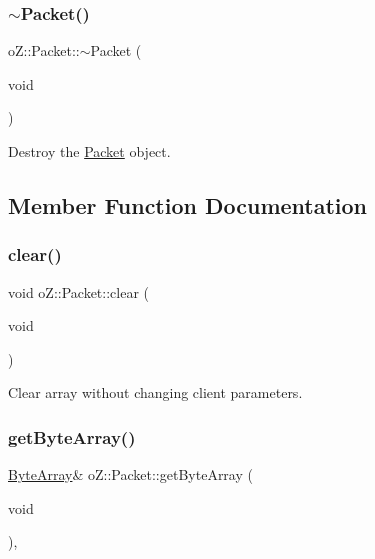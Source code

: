 \mbox{\label{classo_z_1_1_packet_a01d80a0c452b1e07dfd160f494be2af5}} 
\subsubsection{\texorpdfstring{$\sim$Packet()}{~Packet()}}
{\footnotesize\ttfamily o\+Z\+::\+Packet\+::$\sim$\+Packet (\begin{DoxyParamCaption}\item[{void}]{ }\end{DoxyParamCaption})\hspace{0.3cm}{\ttfamily [default]}}



Destroy the \mbox{\hyperlink{classo_z_1_1_packet}{Packet}} object. 



\subsection{Member Function Documentation}
\mbox{\label{classo_z_1_1_packet_aa7eafcf9801973978216f2de4c09867d}} 
\subsubsection{\texorpdfstring{clear()}{clear()}}
{\footnotesize\ttfamily void o\+Z\+::\+Packet\+::clear (\begin{DoxyParamCaption}\item[{void}]{ }\end{DoxyParamCaption})\hspace{0.3cm}{\ttfamily [inline]}}



Clear array without changing client parameters. 

\mbox{\label{classo_z_1_1_packet_a8a5d791e4675a3f065928884b64fe7bf}} 
\subsubsection{\texorpdfstring{getByteArray()}{getByteArray()}\hspace{0.1cm}{\footnotesize\ttfamily [1/2]}}
{\footnotesize\ttfamily \mbox{\hyperlink{namespaceo_z_abfa3f5a46e5c7584615dc1dd33fcafb6}{Byte\+Array}}\& o\+Z\+::\+Packet\+::get\+Byte\+Array (\begin{DoxyParamCaption}\item[{void}]{ }\end{DoxyParamCaption})\hspace{0.3cm}{\ttfamily [inline]}, {\ttfamily [noexcept]}}



